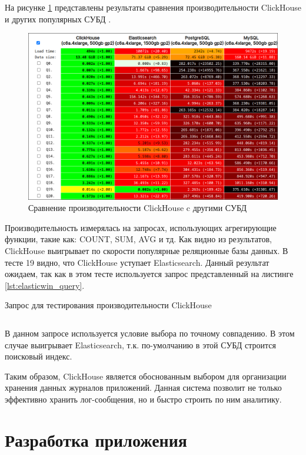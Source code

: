 \documentclass[14pt, russian]{scrartcl}
\begin{document}
На рисунке \ref{fig:clickbench} представлены результаты сравнения производительности ClickHouse и других популярных СУБД \cite{ClickBench}.


\begin{figure}[H]
	\centering
	\begin{minipage}[t]{.9\textwidth}
		\centering
		\includegraphics[width=.7\textwidth]{./imgs/clickbench.png}
	\end{minipage}
	\caption{Сравнение производительности ClickHouse c другими СУБД}
	\label{fig:clickbench}
\end{figure}

Производительность измерялась на запросах, использующих агрегирующие функции, такие как: COUNT, SUM, AVG и тд. Как видно из результатов, ClickHouse
выигрывает по скорости популярные реляционные базы данных. В тесте 19 видно, что ClickHouse уступает Elasticsearch. Данный результат ожидаем,
так как в этом тесте используется запрос представленный на листинге \ref{lst:elasticwin_query}.

\begin{listing}[H]
	\caption{Запрос для тестирования производительности ClickHouse}
	\label{lst:elasticwin_query}
	\inputminted[style=bw, frame=single,fontsize = \footnotesize, linenos=false, xleftmargin = 1.5em]{SQL}{./listings/elastic_win.sql}
\end{listing}

В данном запросе используется условие выбора по точному совпадению. В этом случае выигрывает Elasticsearch,
т.к. по-умолчанию в этой СУБД строится поисковый индекс.

Таким образом, ClickHouse является обоснованным выбором для
организации хранения данных журналов приложений.
Данная система позволит не только эффективно хранить лог-сообщения, но и быстро строить по ним
аналитику.


\section{Разработка приложения}
\end{document}
